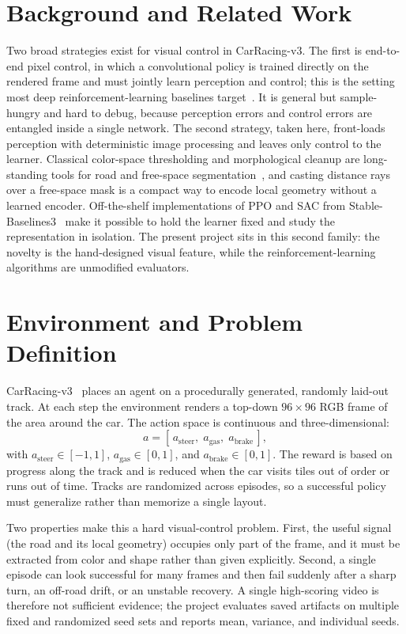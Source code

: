\documentclass[conference]{IEEEtran}
\begin{document}
\section{Background and Related Work}

Two broad strategies exist for visual control in CarRacing-v3. The first is
end-to-end pixel control, in which a convolutional policy is trained directly on
the rendered frame and must jointly learn perception and control; this is the
setting most deep reinforcement-learning baselines target~\cite{ref_ppo,
ref_sac}. It is general but sample-hungry and hard to debug, because perception
errors and control errors are entangled inside a single network. The second
strategy, taken here, front-loads perception with deterministic image processing
and leaves only control to the learner. Classical color-space thresholding and
morphological cleanup are long-standing tools for road and free-space
segmentation~\cite{ref_opencv}, and casting distance rays over a free-space mask
is a compact way to encode local geometry without a learned encoder.
Off-the-shelf implementations of PPO and SAC from
Stable-Baselines3~\cite{ref_sb3, ref_ppo_mod, ref_sac_mod} make it possible to
hold the learner fixed and study the representation in isolation. The present
project sits in this second family: the novelty is the hand-designed visual
feature, while the reinforcement-learning algorithms are unmodified evaluators.

\section{Environment and Problem Definition}

CarRacing-v3~\cite{ref_gym} places an agent on a procedurally generated, randomly
laid-out track. At each step the environment renders a top-down $96\times96$ RGB
frame of the area around the car. The action space is continuous and
three-dimensional:
\begin{equation}
a = [\,a_{\text{steer}},\; a_{\text{gas}},\; a_{\text{brake}}\,],
\end{equation}
with $a_{\text{steer}}\in[-1,1]$, $a_{\text{gas}}\in[0,1]$, and
$a_{\text{brake}}\in[0,1]$. The reward is based on progress along the track and
is reduced when the car visits tiles out of order or runs out of time. Tracks
are randomized across episodes, so a successful policy must generalize rather
than memorize a single layout.

Two properties make this a hard visual-control problem. First, the useful
signal (the road and its local geometry) occupies only part of the frame, and
it must be extracted from color and shape rather than given explicitly. Second,
a single episode can look successful for many frames and then fail suddenly
after a sharp turn, an off-road drift, or an unstable recovery. A single
high-scoring video is therefore not sufficient evidence; the project evaluates
saved artifacts on multiple fixed and randomized seed sets and reports mean,
variance, and individual seeds.
\end{document}
